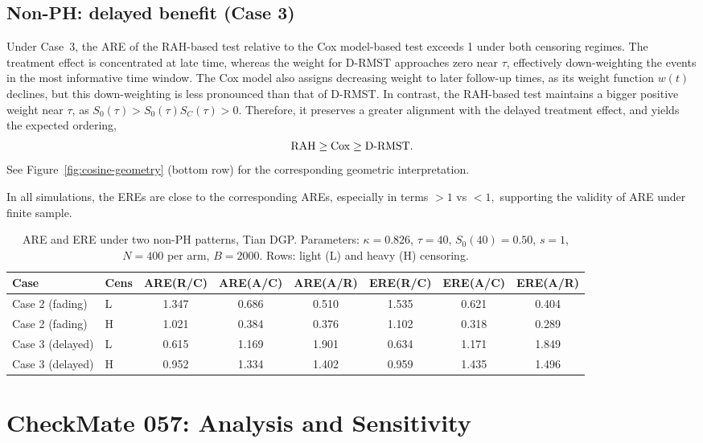 \documentclass[12pt]{article}
\newcommand{\RAH}{\mathrm{RAH}}
\newcommand{\DRMST}{D\text{-}\mathrm{RMST}}
\begin{document}
\subsection{Non-PH: delayed benefit (Case 3)}
\label{sec:sim-delayed}

Under Case~3, the ARE of the RAH-based test relative to the Cox model-based test exceeds 1 under both censoring regimes. The treatment effect is concentrated at late time, whereas the weight for D-RMST approaches zero near $\tau$, effectively down-weighting the events in the most informative time window. The Cox model also assigns decreasing weight to later follow-up times, as its weight function $w(t)$ declines, but this down-weighting is less pronounced than that of D-RMST. In contrast, the RAH-based test maintains a bigger positive weight near $\tau$, as $S_0(\tau)>S_0(\tau)S_C(\tau)>0.$ Therefore, it preserves a greater alignment with the delayed treatment effect, and yields the expected ordering,
$$\RAH \ge \rm{Cox} \ge  \DRMST.$$
See Figure~\ref{fig:cosine-geometry} (bottom row) for the corresponding geometric interpretation.

In all simulations, the EREs are close to the corresponding AREs, especially in terms $>1$ vs $<1,$ supporting the validity of ARE under finite sample.

\begin{table}[ht]
\centering
\small
\caption{ARE and ERE under two non-PH patterns, Tian DGP.
  Parameters: $\kappa=0.826$, $\tau=40$, $S_0(40)=0.50$, $s=1$,
  $N=400$ per arm, $B=2000$.
  Rows: light (L) and heavy (H) censoring.}
\label{tab:main-sim-nonph}
\setlength{\tabcolsep}{4pt}
\begin{tabular}{llcccccc}
\hline
Case & Cens & ARE(R/C) & ARE(A/C) & ARE(A/R) & ERE(R/C) & ERE(A/C) & ERE(A/R) \\
\hline
Case 2 (fading) & L & 1.347 & 0.686 & 0.510 & 1.535 & 0.621 & 0.404 \\
Case 2 (fading) & H & 1.021 & 0.384 & 0.376 & 1.102 & 0.318 & 0.289 \\
Case 3 (delayed) & L & 0.615 & 1.169 & 1.901 & 0.634 & 1.171 & 1.849 \\
Case 3 (delayed) & H & 0.952 & 1.334 & 1.402 & 0.959 & 1.435 & 1.496 \\
\hline
\end{tabular}
\end{table}

\section{CheckMate 057: Analysis and Sensitivity}
\label{sec:cm057-analysis}
\end{document}
